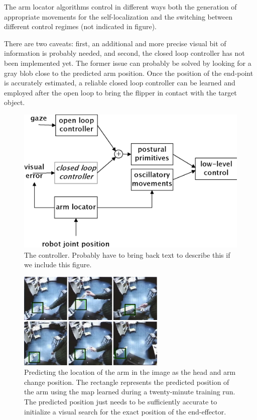 The arm locator algorithms control in different ways both the
generation of appropriate movements for the self-localization and the
switching between different control regimes (not indicated in figure).

There are two caveats: first, an additional and more precise visual
bit of information is probably needed, and second, the closed loop
controller has not been implemented yet. The former issue can probably
be solved by looking for a gray blob close to the predicted arm
position. Once the position of the end-point is accurately estimated,
a reliable closed loop controller can be learned and employed after the
open loop to bring the flipper in contact with the target object.
\fi

\ifverbose
\begin{figure}[tbh]
\begin{center}
\includegraphics[width=\columnwidth]{control-flow.eps}
\caption{ 
\label{fig:control-flow}
%
  The controller.  Probably have to bring back text to describe this
  if we include this figure.
%
}
\end{center}
\end{figure}
\fi

\begin{figure}[tbh]
\begin{center}
\includegraphics[width=7cm]{predict-position.eps}
\caption{ 
\label{fig:predict-position}
%
Predicting the location of the arm in the image as the head and arm
change position. The rectangle represents the predicted position of
the arm using the map learned during a twenty-minute training run.
The predicted position just needs to be sufficiently accurate to
initialize a visual search for the exact position of the end-effector.
%
}
\end{center}
\end{figure}

